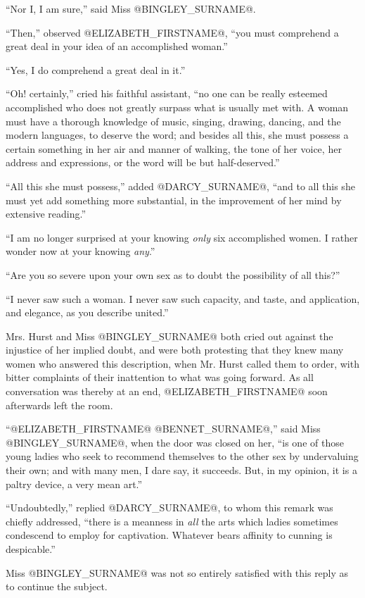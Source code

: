 ``Nor I, I am sure,'' said Miss @BINGLEY_SURNAME@.

``Then,'' observed @ELIZABETH_FIRSTNAME@, ``you must comprehend a great deal in your
idea of an accomplished woman.''

``Yes, I do comprehend a great deal in it.''

``Oh! certainly,'' cried his faithful assistant, ``no one can be really
esteemed accomplished who does not greatly surpass what is usually met
with. A woman must have a thorough knowledge of music, singing, drawing,
dancing, and the modern languages, to deserve the word; and besides
all this, she must possess a certain something in her air and manner of
walking, the tone of her voice, her address and expressions, or the word
will be but half-deserved.''

``All this she must possess,'' added @DARCY_SURNAME@, ``and to all this she must
yet add something more substantial, in the improvement of her mind by
extensive reading.''

``I am no longer surprised at your knowing \textit{only} six accomplished women.
I rather wonder now at your knowing \textit{any}.''

``Are you so severe upon your own sex as to doubt the possibility of all
this?''

``I never saw such a woman. I never saw such capacity, and taste, and
application, and elegance, as you describe united.''

Mrs. Hurst and Miss @BINGLEY_SURNAME@ both cried out against the injustice of her
implied doubt, and were both protesting that they knew many women who
answered this description, when Mr. Hurst called them to order, with
bitter complaints of their inattention to what was going forward. As all
conversation was thereby at an end, @ELIZABETH_FIRSTNAME@ soon afterwards left the
room.

``@ELIZABETH_FIRSTNAME@ @BENNET_SURNAME@,'' said Miss @BINGLEY_SURNAME@, when the door was closed on her,
``is one of those young ladies who seek to recommend themselves to the
other sex by undervaluing their own; and with many men, I dare say, it
succeeds. But, in my opinion, it is a paltry device, a very mean art.''

``Undoubtedly,'' replied @DARCY_SURNAME@, to whom this remark was chiefly addressed,
``there is a meanness in \textit{all} the arts which ladies sometimes condescend
to employ for captivation. Whatever bears affinity to cunning is
despicable.''

Miss @BINGLEY_SURNAME@ was not so entirely satisfied with this reply as to
continue the subject.

